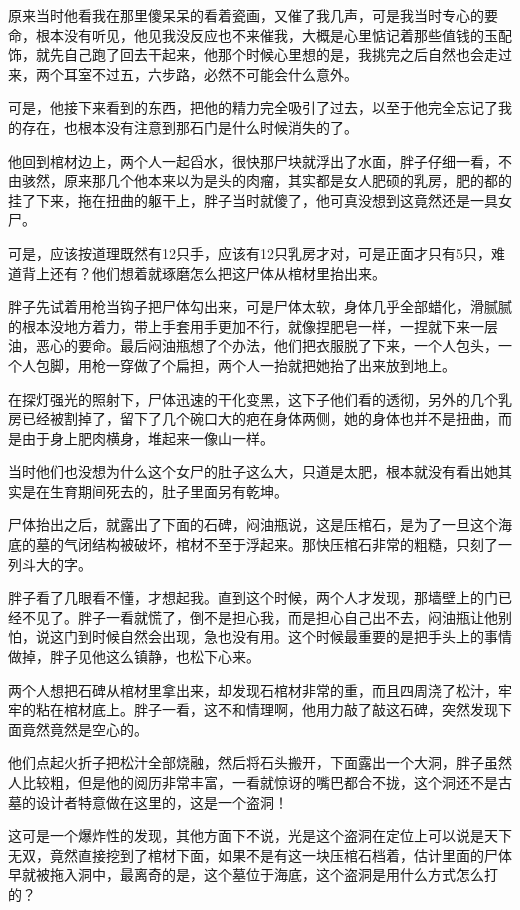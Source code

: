 原来当时他看我在那里傻呆呆的看着瓷画，又催了我几声，可是我当时专心的要命，根本没有听见，他见我没反应也不来催我，大概是心里惦记着那些值钱的玉配饰，就先自己跑了回去干起来，他那个时候心里想的是，我挑完之后自然也会走过来，两个耳室不过五，六步路，必然不可能会什么意外。

可是，他接下来看到的东西，把他的精力完全吸引了过去，以至于他完全忘记了我的存在，也根本没有注意到那石门是什么时候消失的了。

他回到棺材边上，两个人一起舀水，很快那尸块就浮出了水面，胖子仔细一看，不由骇然，原来那几个他本来以为是头的肉瘤，其实都是女人肥硕的乳房，肥的都的挂了下来，拖在扭曲的躯干上，胖子当时就傻了，他可真没想到这竟然还是一具女尸。

可是，应该按道理既然有12只手，应该有12只乳房才对，可是正面才只有5只，难道背上还有？他们想着就琢磨怎么把这尸体从棺材里抬出来。

胖子先试着用枪当钩子把尸体勾出来，可是尸体太软，身体几乎全部蜡化，滑腻腻的根本没地方着力，带上手套用手更加不行，就像捏肥皂一样，一捏就下来一层油，恶心的要命。最后闷油瓶想了个办法，他们把衣服脱了下来，一个人包头，一个人包脚，用枪一穿做了个扁担，两个人一抬就把她抬了出来放到地上。

在探灯强光的照射下，尸体迅速的干化变黑，这下子他们看的透彻，另外的几个乳房已经被割掉了，留下了几个碗口大的疤在身体两侧，她的身体也并不是扭曲，而是由于身上肥肉横身，堆起来一像山一样。

当时他们也没想为什么这个女尸的肚子这么大，只道是太肥，根本就没有看出她其实是在生育期间死去的，肚子里面另有乾坤。

尸体抬出之后，就露出了下面的石碑，闷油瓶说，这是压棺石，是为了一旦这个海底的墓的气闭结构被破坏，棺材不至于浮起来。那快压棺石非常的粗糙，只刻了一列斗大的字。

胖子看了几眼看不懂，才想起我。直到这个时候，两个人才发现，那墙壁上的门已经不见了。胖子一看就慌了，倒不是担心我，而是担心自己出不去，闷油瓶让他别怕，说这门到时候自然会出现，急也没有用。这个时候最重要的是把手头上的事情做掉，胖子见他这么镇静，也松下心来。

两个人想把石碑从棺材里拿出来，却发现石棺材非常的重，而且四周浇了松汁，牢牢的粘在棺材底上。胖子一看，这不和情理啊，他用力敲了敲这石碑，突然发现下面竟然竟然是空心的。

他们点起火折子把松汁全部烧融，然后将石头搬开，下面露出一个大洞，胖子虽然人比较粗，但是他的阅历非常丰富，一看就惊讶的嘴巴都合不拢，这个洞还不是古墓的设计者特意做在这里的，这是一个盗洞！

这可是一个爆炸性的发现，其他方面下不说，光是这个盗洞在定位上可以说是天下无双，竟然直接挖到了棺材下面，如果不是有这一块压棺石档着，估计里面的尸体早就被拖入洞中，最离奇的是，这个墓位于海底，这个盗洞是用什么方式怎么打的？

